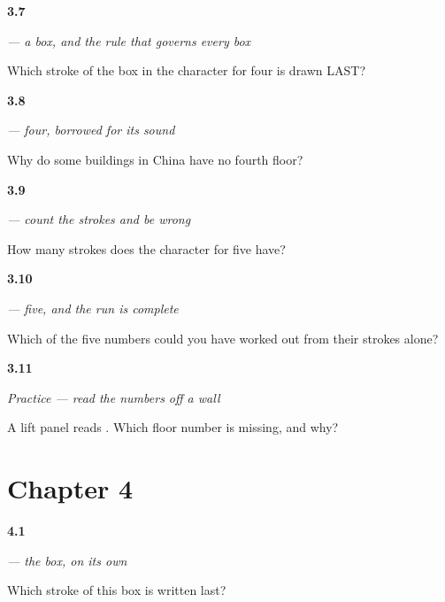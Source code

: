 \noindent\begin{minipage}[t]{\linewidth}
\raggedright
\hypertarget{review-ZH-W03-si-last}{\textbf{3.7}} \emph{ — a box, and the rule that governs every box}\par
\small Which stroke of the box in the character for four is drawn LAST?
\end{minipage}\par\medskip

\noindent\begin{minipage}[t]{\linewidth}
\raggedright
\hypertarget{review-ZH-C03-si-tone}{\textbf{3.8}} \emph{ — four, borrowed for its sound}\par
\small Why do some buildings in China have no fourth floor?
\end{minipage}\par\medskip

\noindent\begin{minipage}[t]{\linewidth}
\raggedright
\hypertarget{review-ZH-W03-wu-strokes}{\textbf{3.9}} \emph{ — count the strokes and be wrong}\par
\small How many strokes does the character for five have?
\end{minipage}\par\medskip

\noindent\begin{minipage}[t]{\linewidth}
\raggedright
\hypertarget{review-ZH-C03-wu-derive}{\textbf{3.10}} \emph{ — five, and the run is complete}\par
\small Which of the five numbers could you have worked out from their strokes alone?
\end{minipage}\par\medskip

\noindent\begin{minipage}[t]{\linewidth}
\raggedright
\hypertarget{review-ZH-C03-practice-lift}{\textbf{3.11}} \emph{Practice — read the numbers off a wall}\par
\small A lift panel reads    . Which floor number is missing, and why?
\end{minipage}\par\medskip

\section*{Chapter 4}

\noindent\begin{minipage}[t]{\linewidth}
\raggedright
\hypertarget{review-ZH-W04-kou-last}{\textbf{4.1}} \emph{ — the box, on its own}\par
\small Which stroke of this box is written last?
\end{minipage}\par\medskip

